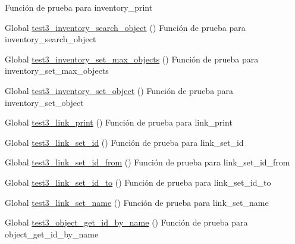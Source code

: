 \begin{DoxyRefList}
%
Función de prueba para inventory\+\_\+print  
\item[Global \mbox{\hyperlink{inventory__test_8c_a1ef29f251219dba3188917159cf5b73c}{test3\+\_\+inventory\+\_\+search\+\_\+object}} ()]\label{test__test000064}%
%
Función de prueba para inventory\+\_\+search\+\_\+object  
\item[Global \mbox{\hyperlink{inventory__test_8c_a270c2d6aecda0d73fbcff6ca0c9a90db}{test3\+\_\+inventory\+\_\+set\+\_\+max\+\_\+objects}} ()]\label{test__test000069}%
%
Función de prueba para inventory\+\_\+set\+\_\+max\+\_\+objects  
\item[Global \mbox{\hyperlink{inventory__test_8c_afeec9d3504d3663c7fb8884e1bb1562d}{test3\+\_\+inventory\+\_\+set\+\_\+object}} ()]\label{test__test000041}%
%
Función de prueba para inventory\+\_\+set\+\_\+object  
\item[Global \mbox{\hyperlink{link__test_8c_a3142c89c0e0ddb961b03ed04d94b8995}{test3\+\_\+link\+\_\+print}} ()]\label{test__test000100}%
%
Función de prueba para link\+\_\+print  
\item[Global \mbox{\hyperlink{link__test_8c_ac4d98b2913728aeb1fe6735ac96bb25a}{test3\+\_\+link\+\_\+set\+\_\+id}} ()]\label{test__test000078}%
%
Función de prueba para link\+\_\+set\+\_\+id  
\item[Global \mbox{\hyperlink{link__test_8c_a009c187bec3c13f4605e88b202ef0dae}{test3\+\_\+link\+\_\+set\+\_\+id\+\_\+from}} ()]\label{test__test000088}%
%
Función de prueba para link\+\_\+set\+\_\+id\+\_\+from  
\item[Global \mbox{\hyperlink{link__test_8c_a794995376a971d30e0fed03287ca372f}{test3\+\_\+link\+\_\+set\+\_\+id\+\_\+to}} ()]\label{test__test000093}%
%
Función de prueba para link\+\_\+set\+\_\+id\+\_\+to  
\item[Global \mbox{\hyperlink{link__test_8c_a8396e33f601deb52c940cb89cd7c6bfe}{test3\+\_\+link\+\_\+set\+\_\+name}} ()]\label{test__test000083}%
%
Función de prueba para link\+\_\+set\+\_\+name  
\item[Global \mbox{\hyperlink{object__test_8c_a13ab730f1fd81af84d2068341fad5d2d}{test3\+\_\+object\+\_\+get\+\_\+id\+\_\+by\+\_\+name}} ()]\label{test__test000121}%
%
Función de prueba para object\+\_\+get\+\_\+id\+\_\+by\+\_\+name  

\end{DoxyRefList}
